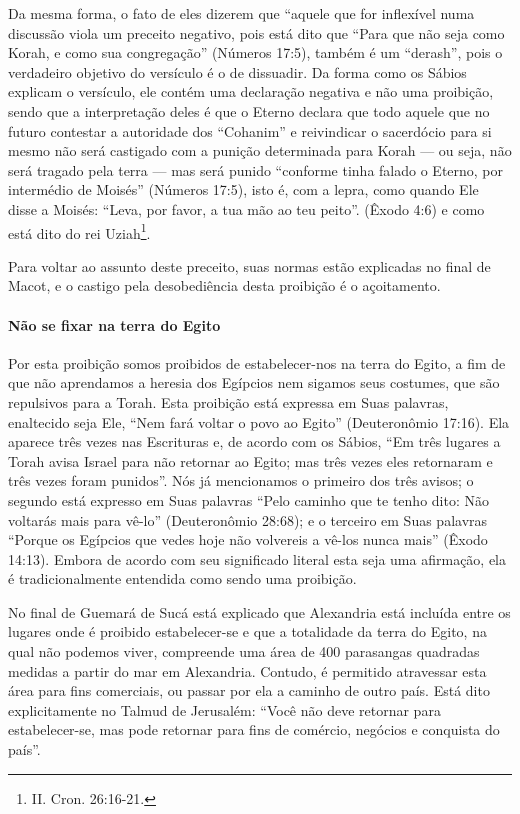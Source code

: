 Da mesma forma, o fato de eles dizerem que ``aquele que for inflexível
numa discussão viola um preceito negativo, pois está dito que ``Para que
não seja como Korah, e como sua congregação'' (Números 17:5), também é
um ``derash'', pois o verdadeiro objetivo do versículo é o de dissuadir.
Da forma como os Sábios explicam o versículo, ele contém uma declaração
negativa e não uma proibição, sendo que a interpretação deles é que o
Eterno declara que todo aquele que no futuro contestar a autoridade dos
``Cohanim'' e reivindicar o sacerdócio para si mesmo não será castigado
com a punição determinada para Korah --- ou seja, não será tragado pela
terra --- mas será punido ``conforme tinha falado o Eterno, por
intermédio de Moisés'' (Números 17:5), isto é, com a lepra, como quando
Ele disse a Moisés: ``Leva, por favor, a tua mão ao teu peito''. (Êxodo
4:6) e como está dito do rei Uziah\footnote{II. Cron. 26:16-21.}.

Para voltar ao assunto deste preceito, suas normas estão explicadas no
final de Macot, e o castigo pela desobediência desta proibição é o
açoitamento.

\paragraph{Não se fixar na terra do Egito}

Por esta proibição somos proibidos de estabelecer-nos na terra do Egito,
a fim de que não aprendamos a heresia dos Egípcios nem sigamos seus
costumes, que são repulsivos para a Torah. Esta proibição está expressa
em Suas palavras, enaltecido seja Ele, ``Nem fará voltar o povo ao
Egito'' (Deuteronômio 17:16). Ela aparece três vezes nas Escrituras e, de acordo com os
Sábios, ``Em três lugares a Torah avisa Israel para não retornar ao
Egito; mas três vezes eles retornaram e três vezes foram punidos''. Nós
já mencionamos o primeiro dos três avisos; o segundo está expresso em
Suas palavras ``Pelo caminho que te tenho dito: Não voltarás mais para
vê-lo'' (Deuteronômio 28:68); e o terceiro em Suas palavras ``Porque os
Egípcios que vedes hoje não volvereis a vê-los nunca mais'' (Êxodo
14:13). Embora de acordo com seu significado literal esta seja uma
afirmação, ela é tradicionalmente entendida como sendo uma proibição.

No final de Guemará de Sucá está explicado que Alexandria está incluída
entre os lugares onde é proibido estabelecer-se e que a totalidade da
terra do Egito, na qual não podemos viver, compreende uma área de 400
parasangas quadradas medidas a partir do mar em Alexandria. Contudo, é
permitido atravessar esta área para fins comerciais, ou passar por ela a
caminho de outro país. Está dito explicitamente no Talmud de Jerusalém:
``Você não deve retornar para estabelecer-se, mas pode retornar para
fins de comércio, negócios e conquista do país''.

